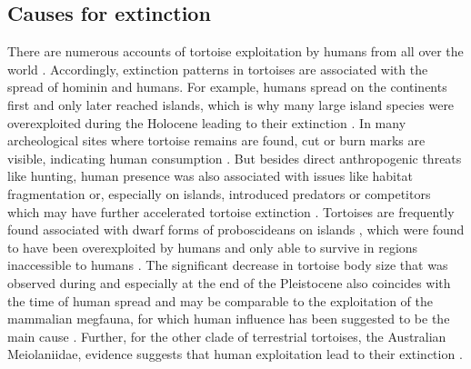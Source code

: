 
%

\subsection{Causes for extinction}
There are numerous accounts of tortoise exploitation by humans from all over the world \citep{Blasco2008,Blasco2011,Blasco2016,Pritchard2013,Speth2002,Thompson2014,Steadman2017,Franz2001,Avery2004,Karl2012,Archer2014,Mudar2007,Munro2010,Peres2006,Sampson1998,Sampson2000}. Accordingly, extinction patterns in tortoises are associated with the spread of hominin and humans. For example, humans spread on the continents first and only later reached islands, which is why many large island species were overexploited during the Holocene leading to their extinction \citep{Rhodin2015}. 
In many archeological sites where tortoise remains are found, cut or burn marks are visible, indicating human consumption \citep{Archer2014,Biton2017,Blasco2008,Blasco2016,Munro2010}. But besides direct anthropogenic threats like hunting, human presence was also associated with issues like habitat fragmentation or, especially on islands, introduced predators or competitors which may have further accelerated tortoise extinction \citep{Sterli2015}. 
Tortoises are frequently found associated with dwarf forms of proboscideans on islands \citep{Hooijer1951,Vlachos2014}, which were found to have been overexploited by humans and only able to survive in regions inaccessible to humans \citep{Surovell2005}.
The significant decrease in tortoise body size that was observed during and especially at the end of the Pleistocene also coincides with the time of human spread and may be comparable to the exploitation of the mammalian megfauna, for which human influence has been suggested to be the main cause \citep{Barnosky2004, Sandom2014}.
Further, for the other clade of terrestrial tortoises, the Australian Meiolaniidae, evidence suggests that human exploitation lead to their extinction \citep{White2010}.
